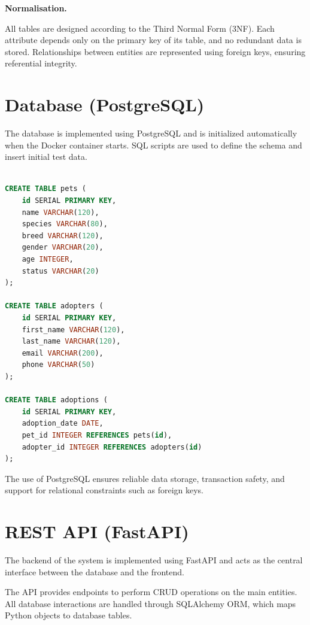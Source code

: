 \documentclass[11pt,a4paper]{article}
\begin{document}
\textbf{Normalisation.}

All tables are designed according to the Third Normal Form (3NF). Each attribute
depends only on the primary key of its table, and no redundant data is stored.
Relationships between entities are represented using foreign keys, ensuring
referential integrity.

\section{Database (PostgreSQL)}


The database is implemented using PostgreSQL and is initialized automatically
when the Docker container starts. SQL scripts are used to define the schema and
insert initial test data.

\begin{lstlisting}[language=SQL, caption={schema.sql (excerpt)}]

CREATE TABLE pets (
    id SERIAL PRIMARY KEY,
    name VARCHAR(120),
    species VARCHAR(80),
    breed VARCHAR(120),
    gender VARCHAR(20),
    age INTEGER,
    status VARCHAR(20)
);

CREATE TABLE adopters (
    id SERIAL PRIMARY KEY,
    first_name VARCHAR(120),
    last_name VARCHAR(120),
    email VARCHAR(200),
    phone VARCHAR(50)
);

CREATE TABLE adoptions (
    id SERIAL PRIMARY KEY,
    adoption_date DATE,
    pet_id INTEGER REFERENCES pets(id),
    adopter_id INTEGER REFERENCES adopters(id)
);

\end{lstlisting}

The use of PostgreSQL ensures reliable data storage, transaction safety, and
support for relational constraints such as foreign keys.

\section{REST API (FastAPI)}


The backend of the system is implemented using FastAPI and acts as the central
interface between the database and the frontend.

The API provides endpoints to perform CRUD operations on the main entities.
All database interactions are handled through SQLAlchemy ORM, which maps Python
objects to database tables.
\end{document}
